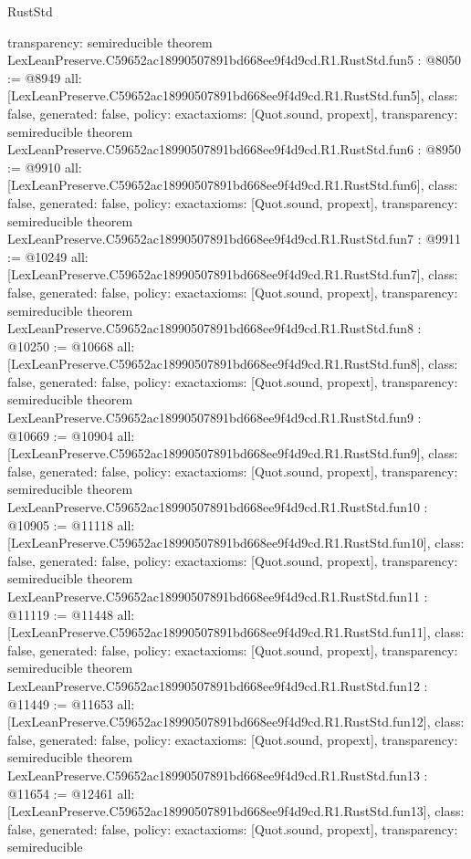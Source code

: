 \begin{lexlean}{RustStd}
\begin{coremodule}
{  transparency: semireducible
}
theorem LexLeanPreserve.C59652ac18990507891bd668ee9f4d9cd.R1.RustStd.fun5 : @8050 := @8949 {
  all: [LexLeanPreserve.C59652ac18990507891bd668ee9f4d9cd.R1.RustStd.fun5],
  class: false,
  generated: false,
  policy: exact{axioms: [Quot.sound, propext]},
  transparency: semireducible
}
theorem LexLeanPreserve.C59652ac18990507891bd668ee9f4d9cd.R1.RustStd.fun6 : @8950 := @9910 {
  all: [LexLeanPreserve.C59652ac18990507891bd668ee9f4d9cd.R1.RustStd.fun6],
  class: false,
  generated: false,
  policy: exact{axioms: [Quot.sound, propext]},
  transparency: semireducible
}
theorem LexLeanPreserve.C59652ac18990507891bd668ee9f4d9cd.R1.RustStd.fun7 : @9911 := @10249 {
  all: [LexLeanPreserve.C59652ac18990507891bd668ee9f4d9cd.R1.RustStd.fun7],
  class: false,
  generated: false,
  policy: exact{axioms: [Quot.sound, propext]},
  transparency: semireducible
}
theorem LexLeanPreserve.C59652ac18990507891bd668ee9f4d9cd.R1.RustStd.fun8 : @10250 := @10668 {
  all: [LexLeanPreserve.C59652ac18990507891bd668ee9f4d9cd.R1.RustStd.fun8],
  class: false,
  generated: false,
  policy: exact{axioms: [Quot.sound, propext]},
  transparency: semireducible
}
theorem LexLeanPreserve.C59652ac18990507891bd668ee9f4d9cd.R1.RustStd.fun9 : @10669 := @10904 {
  all: [LexLeanPreserve.C59652ac18990507891bd668ee9f4d9cd.R1.RustStd.fun9],
  class: false,
  generated: false,
  policy: exact{axioms: [Quot.sound, propext]},
  transparency: semireducible
}
theorem LexLeanPreserve.C59652ac18990507891bd668ee9f4d9cd.R1.RustStd.fun10 : @10905 := @11118 {
  all: [LexLeanPreserve.C59652ac18990507891bd668ee9f4d9cd.R1.RustStd.fun10],
  class: false,
  generated: false,
  policy: exact{axioms: [Quot.sound, propext]},
  transparency: semireducible
}
theorem LexLeanPreserve.C59652ac18990507891bd668ee9f4d9cd.R1.RustStd.fun11 : @11119 := @11448 {
  all: [LexLeanPreserve.C59652ac18990507891bd668ee9f4d9cd.R1.RustStd.fun11],
  class: false,
  generated: false,
  policy: exact{axioms: [Quot.sound, propext]},
  transparency: semireducible
}
theorem LexLeanPreserve.C59652ac18990507891bd668ee9f4d9cd.R1.RustStd.fun12 : @11449 := @11653 {
  all: [LexLeanPreserve.C59652ac18990507891bd668ee9f4d9cd.R1.RustStd.fun12],
  class: false,
  generated: false,
  policy: exact{axioms: [Quot.sound, propext]},
  transparency: semireducible
}
theorem LexLeanPreserve.C59652ac18990507891bd668ee9f4d9cd.R1.RustStd.fun13 : @11654 := @12461 {
  all: [LexLeanPreserve.C59652ac18990507891bd668ee9f4d9cd.R1.RustStd.fun13],
  class: false,
  generated: false,
  policy: exact{axioms: [Quot.sound, propext]},
  transparency: semireducible
}
\end{coremodule}
\end{lexlean}
